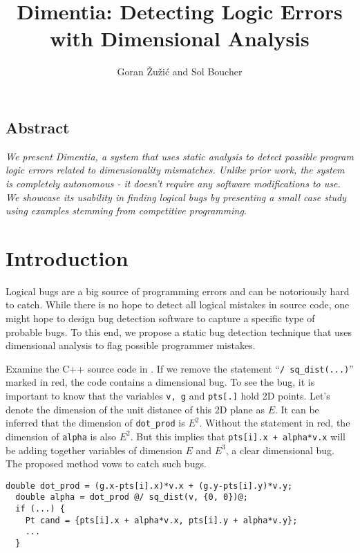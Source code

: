 \documentclass[12pt]{article}
\title{\Large Dimentia: Detecting Logic Errors with Dimensional Analysis}
\author{Goran \v{Z}u\v{z}i\'c and Sol Boucher}
\begin{document}
\maketitle
{}%


\begin{center}
\section*{Abstract}
\parbox{0.8\linewidth}{\textit{We present \textnormal{Dimentia}, a system that uses static analysis to detect possible program logic errors related to dimensionality mismatches.
Unlike prior work, the system is completely autonomous - it doesn't require any software modifications to use.
We showcase its usability in finding logical bugs by presenting a small case study using examples stemming from competitive programming.}}
\end{center}

\newpage
{}%

\section{Introduction}

Logical bugs are a big source of programming errors and can be notoriously hard to catch. While there is no hope to detect all logical mistakes in source code, one might hope to design bug detection software to capture a specific type of probable bugs. To this end, we propose a static bug detection technique that uses dimensional analysis to flag possible programmer mistakes.

Examine the C++ source code in . If we remove the statement ``\texttt{/ sq\_dist(...)}'' marked in red, the code contains a dimensional bug. To see the bug, it is important to know that the variables \texttt{v, g} and \texttt{pts[.]} hold 2D points. Let's denote the dimension of the unit distance of this 2D plane as $E$. It can be inferred that the dimension of \texttt{dot\_prod} is $E^2$. Without the statement in red, the dimension of \texttt{alpha} is also $E^2$. But this implies that \texttt{pts[i].x + alpha*v.x} will be adding together variables of dimension $E$ and $E^3$, a clear dimensional bug. The proposed method vows to catch such bugs.

\begin{lstlisting}[label=code:example1,caption=Example of a dimensional bug]
  double dot_prod = (g.x-pts[i].x)*v.x + (g.y-pts[i].y)*v.y;
  double alpha = dot_prod @/ sq_dist(v, {0, 0})@;
  if (...) {
    Pt cand = {pts[i].x + alpha*v.x, pts[i].y + alpha*v.y};
    ...
  }
\end{lstlisting}
\end{document}
